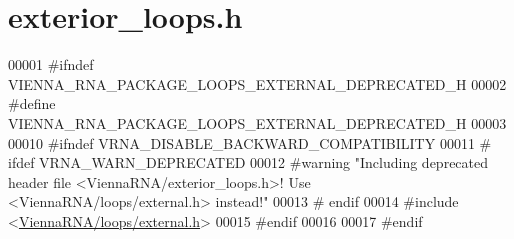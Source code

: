 \hypertarget{exterior__loops_8h_source}{}\section{exterior\+\_\+loops.\+h}
\label{exterior__loops_8h_source}

\begin{DoxyCode}
00001 \textcolor{preprocessor}{#ifndef VIENNA\_RNA\_PACKAGE\_LOOPS\_EXTERNAL\_DEPRECATED\_H}
00002 \textcolor{preprocessor}{#define VIENNA\_RNA\_PACKAGE\_LOOPS\_EXTERNAL\_DEPRECATED\_H}
00003 
00010 \textcolor{preprocessor}{#ifndef VRNA\_DISABLE\_BACKWARD\_COMPATIBILITY}
00011 \textcolor{preprocessor}{# ifdef VRNA\_WARN\_DEPRECATED}
00012 \textcolor{preprocessor}{#warning "Including deprecated header file <ViennaRNA/exterior\_loops.h>! Use <ViennaRNA/loops/external.h>
       instead!"}
00013 \textcolor{preprocessor}{# endif}
00014 \textcolor{preprocessor}{#include <\hyperlink{external_8h}{ViennaRNA/loops/external.h}>}
00015 \textcolor{preprocessor}{#endif}
00016 
00017 \textcolor{preprocessor}{#endif}
\end{DoxyCode}

